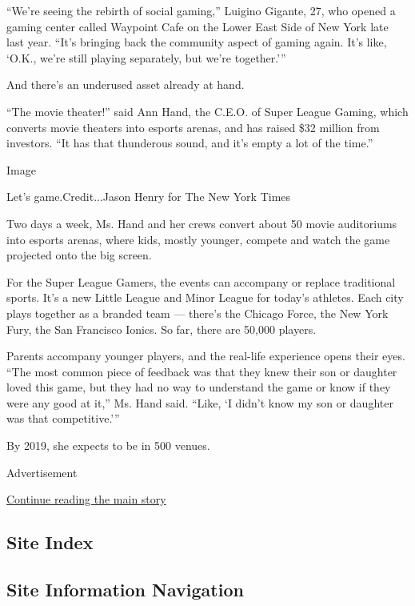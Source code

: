 ``We're seeing the rebirth of social gaming,'' Luigino Gigante, 27, who
opened a gaming center called Waypoint Cafe on the Lower East Side of
New York late last year. ``It's bringing back the community aspect of
gaming again. It's like, `O.K., we're still playing separately, but
we're together.'''

And there's an underused asset already at hand.

``The movie theater!'' said Ann Hand, the C.E.O. of Super League Gaming,
which converts movie theaters into esports arenas, and has raised \$32
million from investors. ``It has that thunderous sound, and it's empty a
lot of the time.''

Image

Let's game.Credit...Jason Henry for The New York Times

Two days a week, Ms. Hand and her crews convert about 50 movie
auditoriums into esports arenas, where kids, mostly younger, compete and
watch the game projected onto the big screen.

For the Super League Gamers, the events can accompany or replace
traditional sports. It's a new Little League and Minor League for
today's athletes. Each city plays together as a branded team --- there's
the Chicago Force, the New York Fury, the San Francisco Ionics. So far,
there are 50,000 players.

Parents accompany younger players, and the real-life experience opens
their eyes. ``The most common piece of feedback was that they knew their
son or daughter loved this game, but they had no way to understand the
game or know if they were any good at it,'' Ms. Hand said. ``Like, `I
didn't know my son or daughter was that competitive.'''

By 2019, she expects to be in 500 venues.

Advertisement

\protect\hyperlink{after-bottom}{Continue reading the main story}

\hypertarget{site-index}{%
\subsection{Site Index}\label{site-index}}

\hypertarget{site-information-navigation}{%
\subsection{Site Information
Navigation}\label{site-information-navigation}}

